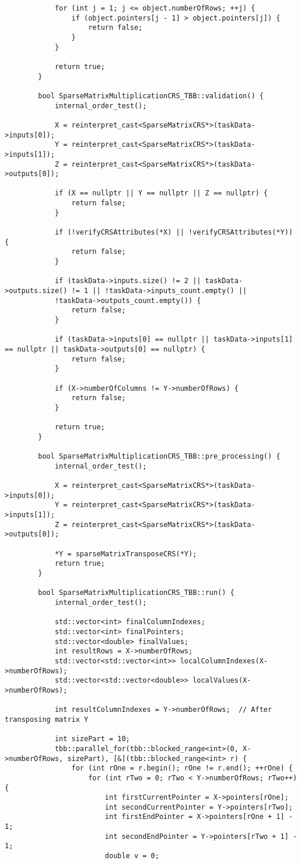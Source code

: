 \documentclass[a4paper, 14pt]{article}
\begin{document}
\begin{verbatim}
			for (int j = 1; j <= object.numberOfRows; ++j) {
				if (object.pointers[j - 1] > object.pointers[j]) {
					return false;
				}
			}
			
			return true;
		}
		
		bool SparseMatrixMultiplicationCRS_TBB::validation() {
			internal_order_test();
			
			X = reinterpret_cast<SparseMatrixCRS*>(taskData->inputs[0]);
			Y = reinterpret_cast<SparseMatrixCRS*>(taskData->inputs[1]);
			Z = reinterpret_cast<SparseMatrixCRS*>(taskData->outputs[0]);
			
			if (X == nullptr || Y == nullptr || Z == nullptr) {
				return false;
			}
			
			if (!verifyCRSAttributes(*X) || !verifyCRSAttributes(*Y)) {
				return false;
			}
			
			if (taskData->inputs.size() != 2 || taskData->outputs.size() != 1 || !taskData->inputs_count.empty() ||
			!taskData->outputs_count.empty()) {
				return false;
			}
			
			if (taskData->inputs[0] == nullptr || taskData->inputs[1] == nullptr || taskData->outputs[0] == nullptr) {
				return false;
			}
			
			if (X->numberOfColumns != Y->numberOfRows) {
				return false;
			}
			
			return true;
		}
		
		bool SparseMatrixMultiplicationCRS_TBB::pre_processing() {
			internal_order_test();
			
			X = reinterpret_cast<SparseMatrixCRS*>(taskData->inputs[0]);
			Y = reinterpret_cast<SparseMatrixCRS*>(taskData->inputs[1]);
			Z = reinterpret_cast<SparseMatrixCRS*>(taskData->outputs[0]);
			
			*Y = sparseMatrixTransposeCRS(*Y);
			return true;
		}
		
		bool SparseMatrixMultiplicationCRS_TBB::run() {
			internal_order_test();
			
			std::vector<int> finalColumnIndexes;
			std::vector<int> finalPointers;
			std::vector<double> finalValues;
			int resultRows = X->numberOfRows;
			std::vector<std::vector<int>> localColumnIndexes(X->numberOfRows);
			std::vector<std::vector<double>> localValues(X->numberOfRows);
			
			int resultColumnIndexes = Y->numberOfRows;  // After transposing matrix Y
			
			int sizePart = 10;
			tbb::parallel_for(tbb::blocked_range<int>(0, X->numberOfRows, sizePart), [&](tbb::blocked_range<int> r) {
				for (int rOne = r.begin(); rOne != r.end(); ++rOne) {
					for (int rTwo = 0; rTwo < Y->numberOfRows; rTwo++) {
						int firstCurrentPointer = X->pointers[rOne];
						int secondCurrentPointer = Y->pointers[rTwo];
						int firstEndPointer = X->pointers[rOne + 1] - 1;
						int secondEndPointer = Y->pointers[rTwo + 1] - 1;
						double v = 0;
						

\end{verbatim}
\end{document}
